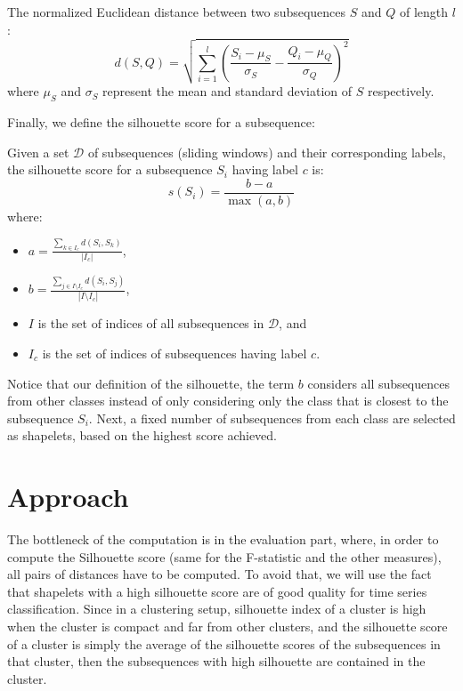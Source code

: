 \documentclass[sigconf, nonacm]{acmart}
\begin{document}
\begin{definition}
	The normalized Euclidean distance between two subsequences $S$ and $Q$ of
	length $l$:
	$$d(S, Q) = \sqrt{\sum_{i=1}^l (\frac{S_i - \mu_S}{\sigma_S} - \frac{Q_i -
				\mu_Q}{\sigma_Q})^2}$$
	where $\mu_S$ and $\sigma_S$ represent the mean and standard deviation of
	$S$ respectively.
\end{definition}

Finally, we define the silhouette score for a subsequence:

\begin{definition}
	Given a set $\mathcal{D}$ of subsequences (sliding windows) and their
	corresponding labels, the silhouette score for a subsequence $S_i$ having label
	$c$ is:
	$$
		s(S_i) = \frac{b - a}{\max{(a, b)}}
	$$
	where:
	\begin{itemize}
		\item $a = \frac{\sum_{k \in I_c}d(S_i, S_k)}{|I_c|}$,
		\item $b = \frac{\sum_{j \in I \setminus I_c}d(S_i, S_j)}{|I \setminus I_c|}$,
		\item $I$ is the set of indices of all subsequences in $\mathcal{D}$, and
		\item $I_c$ is the set of indices of subsequences having label $c$.
	\end{itemize}
\end{definition}

Notice that our definition of the silhouette, the term $b$ considers all
subsequences from other classes instead of only considering only the class that
is closest to the subsequence $S_i$. Next, a fixed number of subsequences from
each class are selected as shapelets, based on the highest score achieved.


\section{Approach}
The bottleneck of the computation is in the evaluation part, where, in order to
compute the Silhouette score (same for the F-statistic and the other measures),
all pairs of distances have to be computed. To avoid that, we will use the fact
that shapelets with a high silhouette score are of good quality for time
series classification. Since in a clustering setup, silhouette index of a
cluster is high when the cluster is compact and far from other clusters, and
the silhouette score of a cluster is simply the average of the silhouette
scores of the subsequences in that cluster, then the subsequences with high
silhouette are contained in the cluster.
\end{document}
